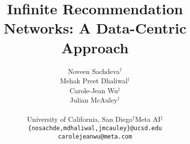 \documentclass{article}
\title{Infinite Recommendation Networks: A Data-Centric Approach}
\author{Noveen Sachdeva$^\dagger$ \\
  \And Mehak Preet Dhaliwal$^\dagger$  \\
    \And Carole-Jean Wu$^\ddagger$ \\
      \And Julian McAuley$^\dagger$ \\
        \AND
        {}\vspace{-0.7cm}\\      
    University of California, San Diego$^\dagger$\quad Meta AI$^\ddagger$\\[1ex]
    \texttt{\{nosachde,mdhaliwal,jmcauley\}@ucsd.edu}\\[.5ex] \texttt{carolejeanwu@meta.com}
}
\begin{document}
\clearpage{}\makeatletter \renewcommand\paragraph{ {2mm \@plus1ex \@minus.2ex} {-0.7em} {\normalfont\normalsize\bfseries}} \makeatother

\newcommand{\listheader}[1]{\item \emph{#1} }

\newcommand\overstar[1]{\ThisStyle{\ensurestackMath{\setbox0=\hbox{$\SavedStyle#1$}\stackengine{0pt}{\copy0}{\kern.2\ht0\smash{\SavedStyle*}}{O}{c}{F}{T}{S}}}}

\newtheorem{theorem}{Theorem}[section]
\newtheorem{lemma}[theorem]{Lemma}
\newtheorem{proposition}[theorem]{Proposition}
\newtheorem{definition}[theorem]{Definition}

\newcommand{\STAB}[1]{\begin{tabular}{@{}c@{}}#1\end{tabular}}

\newcommand{\bs}[1]{\ensuremath{\bm{\mathit{#1}}}}

\newcommand{\ie}[0]{\emph{i.e.}\xspace}
\newcommand{\etc}[0]{\emph{etc.}\xspace}
\newcommand{\eg}[0]{\emph{e.g.}\xspace}
\newcommand{\vs}[0]{\emph{vs.}\xspace}
\newcommand{\wrt}[0]{\emph{w.r.t.}\xspace}
\clearpage{}
\clearpage{}\newcommand{\dataset}[0]{$\mathcal{D}$\xspace}
\newcommand{\sampled}[0]{$\mathcal{D}'$\xspace}
\newcommand{\argmin}[1]{\underset{#1}{\operatorname{arg}\,\operatorname{min}}\;}
\newcommand{\expectation}[2]{\underset{#1}{\mathbb{E}} \left[#2\right]}

\newcommand{\sampler}{\textsc{Distill-CF}\xspace}
\newcommand{\model}{\textsc{$\infty$-AE}\xspace}


\newcommand{\EE}{\operatornamewithlimits{\mathbb{E}}} %
\clearpage{}

\maketitle
\end{document}

